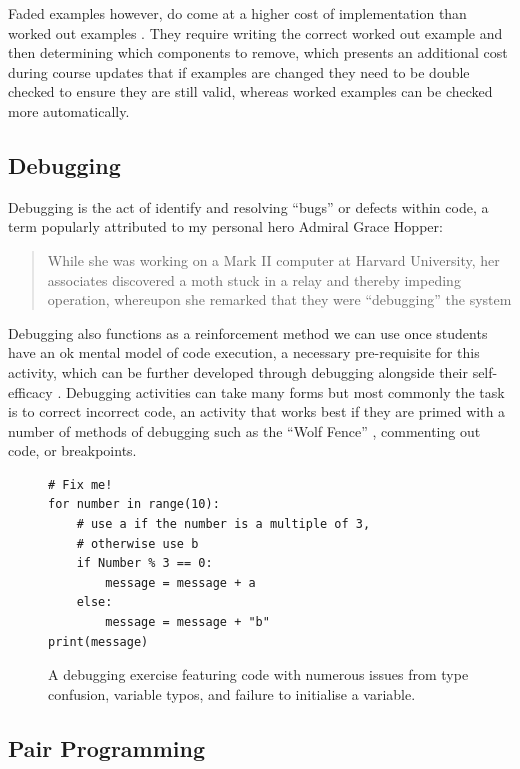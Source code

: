 \documentclass[paper=a4,]{tufte-handout}
\begin{document}
Faded examples however, do come at a higher cost of implementation than
worked out examples \citep{Zamary_2018}. They require writing the
correct worked out example and then determining which components to
remove, which presents an additional cost during course updates that if
examples are changed they need to be double checked to ensure they are
still valid, whereas worked examples can be checked more automatically.

\hypertarget{debugging}{%
\subsection{Debugging}\label{debugging}}

Debugging is the act of identify and resolving ``bugs'' or defects
within code, a term popularly attributed to my personal hero Admiral
Grace Hopper:

\begin{quote}
While she was working on a Mark II computer at Harvard University, her
associates discovered a moth stuck in a relay and thereby impeding
operation, whereupon she remarked that they were ``debugging'' the
system \citep{enwiki:1069955193}
\end{quote}

Debugging also functions as a reinforcement method we can use once
students have an ok mental model of code execution, a necessary
pre-requisite for this activity, which can be further developed through
debugging \citep{Ramalingam_2004} alongside their self-efficacy
\citep{Michaeli_2019}. Debugging activities can take many forms but most
commonly the task is to correct incorrect code, an activity that works
best if they are primed with a number of methods of debugging
\citep{Murphy_2008} such as the ``Wolf Fence'' \citep{Gauss_1982},
commenting out code, or breakpoints.

\begin{figure}[]
\begin{lstlisting}
# Fix me!
for number in range(10):
    # use a if the number is a multiple of 3,
    # otherwise use b
    if Number % 3 == 0:
        message = message + a
    else:
        message = message + "b"
print(message)
\end{lstlisting}
\caption{A debugging exercise featuring code with numerous issues from type confusion, variable typos, and failure to initialise a variable.\label{fig:debug}}
\end{figure}

\hypertarget{pair-programming}{%
\subsection{Pair Programming}\label{pair-programming}}
\end{document}
